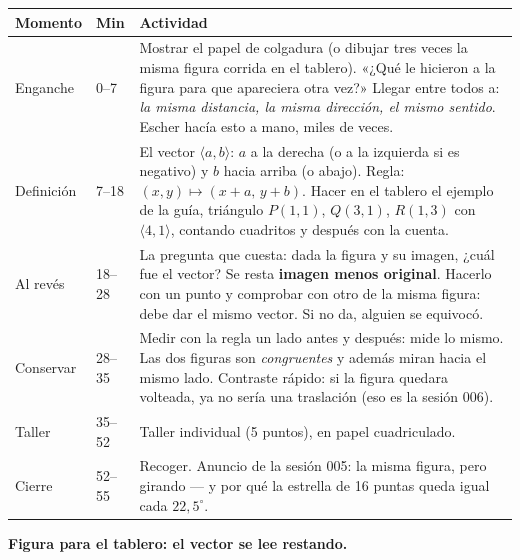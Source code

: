 \documentclass[11pt]{article}
\begin{document}
\begin{center}
{\renewcommand{\arraystretch}{1.3}
\begin{tabularx}{\linewidth}{@{}l l X@{}}
  \toprule
  \textbf{Momento} & \textbf{Min} & \textbf{Actividad}\\
  \midrule
  Enganche & 0--7 & Mostrar el papel de colgadura (o dibujar tres veces la misma figura
    corrida en el tablero). «¿Qué le hicieron a la figura para que apareciera otra vez?»
    Llegar entre todos a: \emph{la misma distancia, la misma dirección, el mismo sentido}.
    Escher hacía esto a mano, miles de veces.\\
  Definición & 7--18 & El vector $\langle a, b\rangle$: $a$ a la derecha (o a la izquierda si
    es negativo) y $b$ hacia arriba (o abajo). Regla: $(x, y) \mapsto (x+a,\, y+b)$. Hacer
    en el tablero el ejemplo de la guía, triángulo $P(1,1)$, $Q(3,1)$, $R(1,3)$ con
    $\langle 4, 1\rangle$, contando cuadritos y después con la cuenta.\\
  Al revés & 18--28 & La pregunta que cuesta: dada la figura y su imagen, ¿cuál fue el
    vector? Se resta \textbf{imagen menos original}. Hacerlo con un punto y comprobar con
    otro de la misma figura: debe dar el mismo vector. Si no da, alguien se equivocó.\\
  Conservar & 28--35 & Medir con la regla un lado antes y después: mide lo mismo. Las dos
    figuras son \emph{congruentes} y además miran hacia el mismo lado. Contraste rápido:
    si la figura quedara volteada, ya no sería una traslación (eso es la sesión 006).\\
  Taller & 35--52 & Taller individual (5 puntos), en papel cuadriculado.\\
  Cierre & 52--55 & Recoger. Anuncio de la sesión 005: la misma figura, pero girando —
    y por qué la estrella de 16 puntas queda igual cada $22{,}5^\circ$.\\
  \bottomrule
\end{tabularx}}
\end{center}

\textbf{Figura para el tablero: el vector se lee restando.}

\begin{center}
\end{center}
\end{document}
